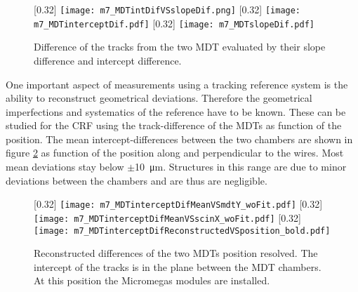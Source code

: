 \documentclass[
twoside,            %
BCOR1.4cm,          %
10pt,               %
headings=normal,    %
headsepline,        %
clearplainpage,		%
final,              %
div=14,
open=right,
bibliography=toc
]{scrreprt}
\begin{document}
\begin{figure}[!h]
	\centering
	[0.32\textwidth]
	{\texttt{[image: m7\_MDTintDifVSslopeDif.png]}}
	\hfill
	[0.32\textwidth]
	{\texttt{[image: m7\_MDTinterceptDif.pdf]}}
	\hfill
	[0.32\textwidth]
	{\texttt{[image: m7\_MDTslopeDif.pdf]}}
	\vspace{-2mm}
	\caption{
		Difference of the tracks from the two MDT evaluated by their slope difference and intercept difference.
	}
	\label{MDTdifferences} 
\end{figure}

One important aspect of measurements using a tracking reference system is the ability to reconstruct geometrical deviations.
Therefore the geometrical imperfections and systematics of the reference have to be known.
These can be studied for the CRF using the track-difference of the MDTs as function of the position.
The mean intercept-differences between the two chambers are shown in figure \ref{MDTdifVSpos} as function of the position along and perpendicular to the wires.
Most mean deviations stay below $\pm$\SI{10}{\micro\m}.
Structures in this range are due to minor deviations between the chambers and are thus are negligible.

\begin{figure}[!h]
	\centering
	[0.32\textwidth]
	{\texttt{[image: m7\_MDTinterceptDifMeanVSmdtY\_woFit.pdf]}}
	\hfill
	[0.32\textwidth]
	{\texttt{[image: m7\_MDTinterceptDifMeanVSscinX\_woFit.pdf]}}
	[0.32\textwidth]
	{\texttt{[image: m7\_MDTinterceptDifReconstructedVSposition\_bold.pdf]}}
	\vspace{-2mm}
	\caption{
		Reconstructed differences of the two MDTs position resolved.
		The intercept of the tracks is in the plane between the MDT chambers. 
		At this position the Micromegas modules are installed.
	}
	\label{MDTdifVSpos}
\end{figure}
\end{document}
